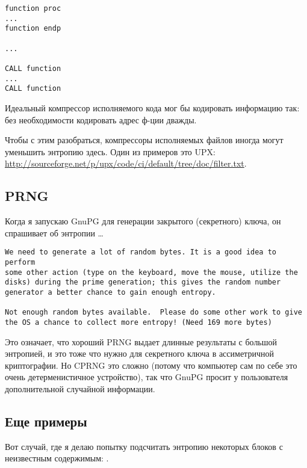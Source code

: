 \begin{lstlisting}[style=customasmx86]
function proc
...
function endp

...

CALL function
...
CALL function
\end{lstlisting}

Идеальный компрессор исполняемого кода мог бы кодировать информацию так:
 без необходимости кодировать
адрес ф-ции  дважды.

Чтобы с этим разобраться, компрессоры исполняемых файлов иногда могут уменьшить энтропию здесь.
Один из примеров это UPX: \url{http://sourceforge.net/p/upx/code/ci/default/tree/doc/filter.txt}.

\subsection{\ac{PRNG}}

Когда я запускаю GnuPG для генерации закрытого (секретного) ключа, он спрашивает об энтропии \dots

\begin{lstlisting}
We need to generate a lot of random bytes. It is a good idea to perform
some other action (type on the keyboard, move the mouse, utilize the
disks) during the prime generation; this gives the random number
generator a better chance to gain enough entropy.

Not enough random bytes available.  Please do some other work to give
the OS a chance to collect more entropy! (Need 169 more bytes)
\end{lstlisting}

Это означает, что хороший \ac{PRNG} выдает длинные результаты с большой энтропией,
и это тоже что нужно для секретного ключа в ассиметричной криптографии.
Но \ac{CPRNG} это сложно (потому что компьютер сам по себе это очень детерменистичное устройство),
так что GnuPG просит у пользователя дополнительной случайной информации.

\subsection{Еще примеры}

Вот случай, где я делаю попытку подсчитать энтропию некоторых блоков с неизвестным содержимым: .



